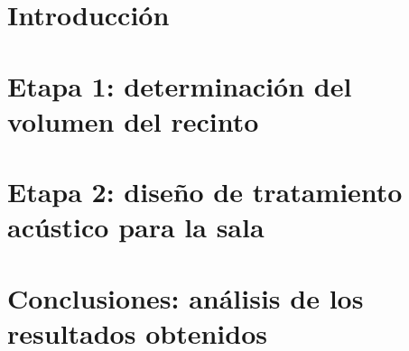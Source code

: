 \documentclass[10pt,a4paper]{article}
\begin{document}
		
	
\tableofcontents
\newpage
\setcounter{page}{1}


\section{Introducción}
	

\section{Etapa 1: determinación del volumen del recinto}
	

\section{Etapa 2: diseño de tratamiento acústico para la sala}
	

\section{Conclusiones: análisis de los resultados obtenidos}
	
%
\end{document}
